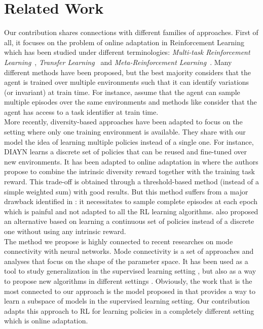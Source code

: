 \vspace{-0.4cm}
\section{Related Work}
\label{sec:relatedwork}
\vspace{-0.4cm}
Our contribution shares connections with different families of approaches. First of all, it focuses on  the problem of online adaptation in Reinforcement Learning which has been studied under different terminologies: \textit{Multi-task Reinforcement Learning}~\citep{multitask_RL, distral}, \textit{Transfer Learning}~\citep{transferrl, lazaric2012transfer} and \textit{Meta-Reinforcement Learning}~\citep{MAML,Hausman2018LatentSpace,task_inference}. Many different methods have been proposed, but the best majority considers that the agent is trained over multiple environments such that it can identify variations (or invariant) at train time. For instance, \cite{Duan2016RL2} assume that the agent can sample multiple episodes over the same environments and methods like \citep{DBLP:journals/corr/abs-2005-02934, DBLP:conf/icml/LiuRLF21} consider that the agent has access to a task identifier at train time. \\
\indent More recently, diversity-based approaches have been adapted to focus on the setting where only one training environment is available. They share with our model the idea of learning multiple policies instead of a single one.  For instance, DIAYN \citep{diayn} learns a discrete set of policies that can be reused and fine-tuned over new environments. It has been adapted to online adaptation in \citep{DBLP:conf/nips/KumarKLF20} where the authors propose to combine the intrinsic diversity reward together with the training task reward. This trade-off is obtained through a threshold-based method (instead of a simple weighted sum) with good results. But this method suffers from a major drawback identified in \citep{Tokyo}: it necessitates to sample complete episodes at each epoch which is painful and not adapted to all the RL learning algorithms. \cite{Tokyo} also proposed an alternative based on learning a continuous set of policies instead of a discrete one without using any intrinsic reward.\\
\indent The method we propose is highly connected to recent researches on mode connectivity with neural networks. Mode connectivity is a set of approaches and analyses that focus on the shape of the parameter space. It has been used as a tool to study generalization in the supervised learning setting \citep{DBLP:conf/nips/GaripovIPVW18}, but also as a way to propose new algorithms in different settings \citep{DBLP:conf/iclr/MirzadehFGP021}. Obviously, the work that is the most connected to our approach is the model proposed in \citep{LearningSubspaces} that provides a way to learn a subspace of models in the supervised learning setting. Our contribution adapts this approach to RL for learning policies in a completely different setting which is online adaptation. \\
